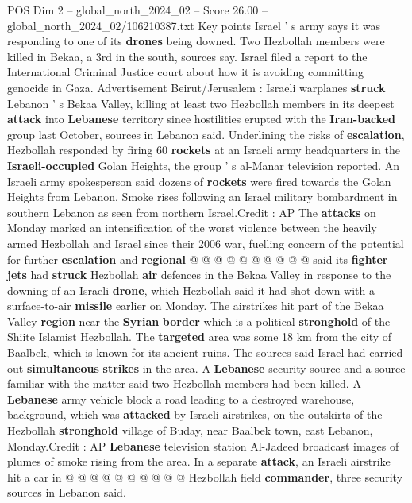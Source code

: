 \begin{textsample}{POS Dim 2 – global\_north\_2024\_02 – Score 26.00 – global\_north\_2024\_02/106210387.txt}  \label{ex:f2_pos_264}
Key points Israel ' s army says it was responding to one of its \textbf{drones} being downed.
Two Hezbollah members were killed in Bekaa, a 3rd in the south, sources say.
Israel filed a report to the International Criminal Justice court about how it is avoiding committing genocide in Gaza.
Advertisement Beirut/Jerusalem : Israeli warplanes \textbf{struck} Lebanon ' s Bekaa Valley, killing at least two Hezbollah members in its deepest \textbf{attack} into \textbf{Lebanese} territory since hostilities erupted with the \textbf{Iran-backed} group last October, sources in Lebanon said.
Underlining the risks of \textbf{escalation}, Hezbollah responded by firing 60 \textbf{rockets} at an Israeli army headquarters in the \textbf{Israeli-occupied} Golan Heights, the group ' s al-Manar television reported.
An Israeli army spokesperson said dozens of \textbf{rockets} were fired towards the Golan Heights from Lebanon.
Smoke rises following an Israel military bombardment in southern Lebanon as seen from northern Israel.Credit : AP The \textbf{attacks} on Monday marked an intensification of the worst violence between the heavily armed Hezbollah and Israel since their 2006 war, fuelling concern of the potential for further \textbf{escalation} and \textbf{regional} @ @ @ @ @ @ @ @ @ @ said its \textbf{fighter} \textbf{jets} had \textbf{struck} Hezbollah \textbf{air} defences in the Bekaa Valley in response to the downing of an Israeli \textbf{drone}, which Hezbollah said it had shot down with a surface-to-air \textbf{missile} earlier on Monday.
The airstrikes hit part of the Bekaa Valley \textbf{region} near the \textbf{Syrian} \textbf{border} which is a political \textbf{stronghold} of the Shiite Islamist Hezbollah.
The \textbf{targeted} area was some 18 km from the city of Baalbek, which is known for its ancient ruins.
The sources said Israel had carried out \textbf{simultaneous} \textbf{strikes} in the area.
A \textbf{Lebanese} security source and a source familiar with the matter said two Hezbollah members had been killed.
A \textbf{Lebanese} army vehicle block a road leading to a destroyed warehouse, background, which was \textbf{attacked} by Israeli airstrikes, on the outskirts of the Hezbollah \textbf{stronghold} village of Buday, near Baalbek town, east Lebanon, Monday.Credit : AP \textbf{Lebanese} television station Al-Jadeed broadcast images of plumes of smoke rising from the area.
In a separate \textbf{attack}, an Israeli airstrike hit a car in @ @ @ @ @ @ @ @ @ @ Hezbollah field \textbf{commander}, three security sources in Lebanon said.

\end{textsample}
